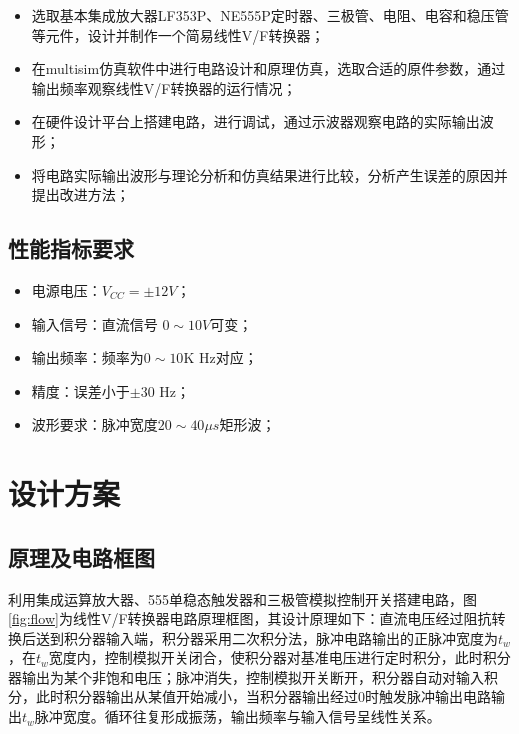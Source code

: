 \documentclass[12pt]{article}
\begin{document}
\begin{itemize}
    \item 选取基本集成放大器LF353P、NE555P定时器、三极管、电阻、电容和稳压管等元件，设计并制作一个简易线性V/F转换器；
    \item 在multisim仿真软件中进行电路设计和原理仿真，选取合适的原件参数，通过输出频率观察线性V/F转换器的运行情况；
    \item 在硬件设计平台上搭建电路，进行调试，通过示波器观察电路的实际输出波形；
    \item 将电路实际输出波形与理论分析和仿真结果进行比较，分析产生误差的原因并提出改进方法；
\end{itemize}

\subsection{性能指标要求}

\begin{itemize}
    \item 电源电压：$V_{CC}=\pm 12V$；
    \item 输入信号：直流信号 $0\sim 10V$可变；
    \item 输出频率：频率为$0\sim 10$K Hz对应；
    \item 精度：误差小于$\pm 30 $ Hz；
    \item 波形要求：脉冲宽度$20 \sim 40 \mu s$矩形波；
\end{itemize}

\section{设计方案}

\subsection{原理及电路框图}

利用集成运算放大器、555单稳态触发器和三极管模拟控制开关搭建电路，图\ref{fig:flow}为线性V/F转换器电路原理框图，其设计原理如下：直流电压经过阻抗转换后送到积分器输入端，积分器采用二次积分法，脉冲电路输出的正脉冲宽度为$t_w$，在$t_w$宽度内，控制模拟开关闭合，使积分器对基准电压进行定时积分，此时积分器输出为某个非饱和电压；脉冲消失，控制模拟开关断开，积分器自动对输入积分，此时积分器输出从某值开始减小，当积分器输出经过0时触发脉冲输出电路输出$t_w$脉冲宽度。循环往复形成振荡，输出频率与输入信号呈线性关系。
\end{document}
